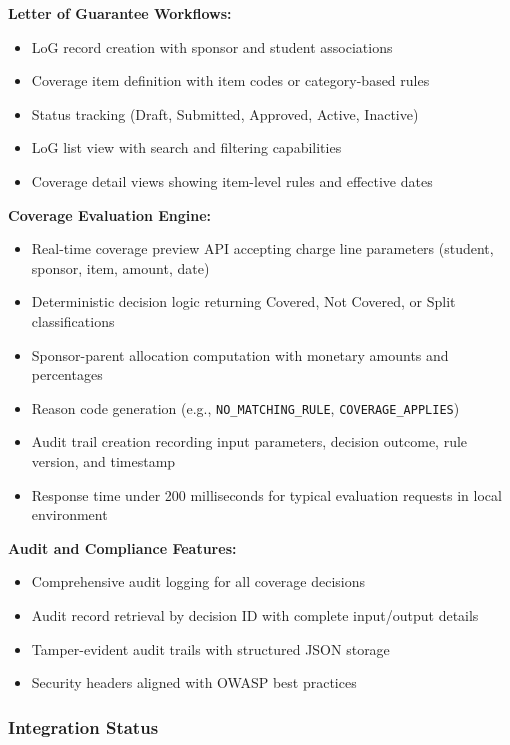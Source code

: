 \textbf{Letter of Guarantee Workflows:}
\begin{itemize}
    \item LoG record creation with sponsor and student associations
    \item Coverage item definition with item codes or category-based rules
    \item Status tracking (Draft, Submitted, Approved, Active, Inactive)
    \item LoG list view with search and filtering capabilities
    \item Coverage detail views showing item-level rules and effective dates
\end{itemize}

\textbf{Coverage Evaluation Engine:}
\begin{itemize}
    \item Real-time coverage preview API accepting charge line parameters (student, sponsor, item, amount, date)
    \item Deterministic decision logic returning Covered, Not Covered, or Split classifications
    \item Sponsor-parent allocation computation with monetary amounts and percentages
    \item Reason code generation (e.g., \texttt{NO\_MATCHING\_RULE}, \texttt{COVERAGE\_APPLIES})
    \item Audit trail creation recording input parameters, decision outcome, rule version, and timestamp
    \item Response time under 200 milliseconds for typical evaluation requests in local environment
\end{itemize}

\textbf{Audit and Compliance Features:}
\begin{itemize}
    \item Comprehensive audit logging for all coverage decisions
    \item Audit record retrieval by decision ID with complete input/output details
    \item Tamper-evident audit trails with structured JSON storage
    \item Security headers aligned with OWASP best practices
\end{itemize}

\subsubsection{Integration Status}


